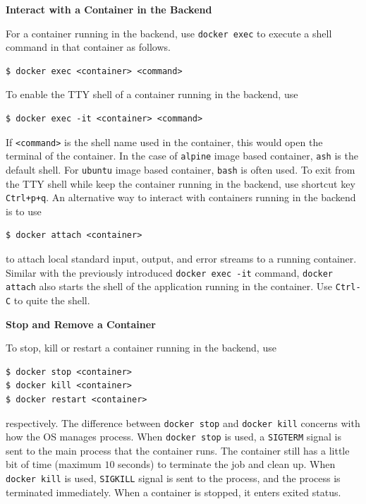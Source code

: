 \vspace{0.1in}
\noindent \textbf{Interact with a Container in the Backend}
\vspace{0.1in}

For a container running in the backend, use \verb|docker exec| to execute a shell command in that container as follows.
\begin{lstlisting}
$ docker exec <container> <command>
\end{lstlisting}
To enable the TTY shell of a container running in the backend, use
\begin{lstlisting}
$ docker exec -it <container> <command>
\end{lstlisting}
If \verb|<command>| is the shell name used in the container, this would open the terminal of the container. In the case of \verb|alpine| image based container, \verb|ash| is the default shell. For \verb|ubuntu| image based container, \verb|bash| is often used. To exit from the TTY shell while keep the container running in the backend, use shortcut key \verb|Ctrl+p+q|. An alternative way to interact with containers running in the backend is to use
\begin{lstlisting}
$ docker attach <container>
\end{lstlisting}
to attach local standard input, output, and error streams to a running container. Similar with the previously introduced \texttt{docker exec -it} command, \texttt{docker attach} also starts the shell of the application running in the container. Use \verb|Ctrl-C| to quite the shell.

\vspace{0.1in}
\noindent \textbf{Stop and Remove a Container}
\vspace{0.1in}

To stop, kill or restart a container running in the backend, use
\begin{lstlisting}
$ docker stop <container>
$ docker kill <container>
$ docker restart <container>
\end{lstlisting}
respectively. The difference between \verb|docker stop| and \verb|docker kill| concerns with how the OS manages process. When \verb|docker stop| is used, a  \verb|SIGTERM| signal is sent to the main process that the container runs. The container still has a little bit of time (maximum $10$ seconds) to terminate the job and clean up. When \verb|docker kill| is used, \verb|SIGKILL| signal is sent to the process, and the process is terminated immediately. When a container is stopped, it enters exited status.

